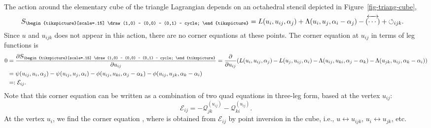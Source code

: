 \documentclass[pdftex]{sigma}
\newcommand{\inversion}[1]{\!\overleftrightarrow{\,#1\,}\!}
\newcommand{\reverse}{{\,\overleftrightarrow{\!(\cdots)\!}\,}}
\newcommand{\triang}{{\begin{tikzpicture}[scale=.15]
			\draw (1,0) -- (0,0) -- (0,1) -- cycle;
\end{tikzpicture}}}
\newcommand{\cyclic}{{\circlearrowleft}_{ijk}}
\newcommand{\pdv}[2]{\frac{\partial {#1}}{\partial {#2}}}
\numberwithin{equation}{section}
\begin{document}
The action around the elementary cube of the triangle Lagrangian depends on an octahedral stencil depicted in Figure~\ref{fig-triang-cube},
\begin{align}\label{Striangle}
 S_\triang &= L(u_i,u_{ij},\alpha_j) + \Lambda(u_i,u_j,\alpha_i-\alpha_j) - \reverse + \cyclic .
\end{align}
Since $u$ and $u_{ijk}$ does not appear in this action, there are no corner equations at these points.
The corner equation at $u_{ij}$ in terms of leg functions is
\begin{align}
	0 &= \pdv{S_\triang}{u_{ij}}
 = \pdv{}{u_{ij}} ( L(u_i,u_{ij},\alpha_j)\hspace{-0.5pt} -\hspace{-0.5pt} L(u_j,u_{ij},\alpha_i)\hspace{-0.5pt} - \hspace{-0.5pt} \Lambda(u_{ij},u_{ki}, \alpha_j-\alpha_k) \hspace{-0.5pt}-\hspace{-0.5pt} \Lambda(u_{jk},u_{ij}, \alpha_k-\alpha_i)) \notag \\
 &= \psi(u_{ij},u_i,\alpha_j) - \psi(u_{ij},u_j,\alpha_i) - \phi(u_{ij},u_{ki}, \alpha_j-\alpha_k) - \phi(u_{ij},u_{jk}, \alpha_k-\alpha_i) \notag \\
 & =: \mathcal{E}_{ij} .\label{triangle-corners}
\end{align}
Note that this corner equation can be written as a combination of two quad equations in three-leg form, based at the vertex $u_{ij}$:
\begin{equation}\label{fourlegE-QQ}
 \mathcal{E}_{ij} = -\mathcal Q^{(u_{ij})}_{jk} - \mathcal Q^{(u_{ij})}_{ki} .
\end{equation}
At the vertex $u_i$, we find the corner equation \smash{$\inversion{\mathcal{E}}_{ij} = 0$}, where \smash{$\inversion{\mathcal{E}}_{ij} := -\mathcal{Q}^{(u_k)}_{jk} - \mathcal{Q}^{(u_k)}_{ki}$} is obtained from $\mathcal{E}_{ij}$ by point inversion in the cube, i.e., $u \leftrightarrow u_{ijk}$, $u_i \leftrightarrow u_{jk}$, etc.
\end{document}
